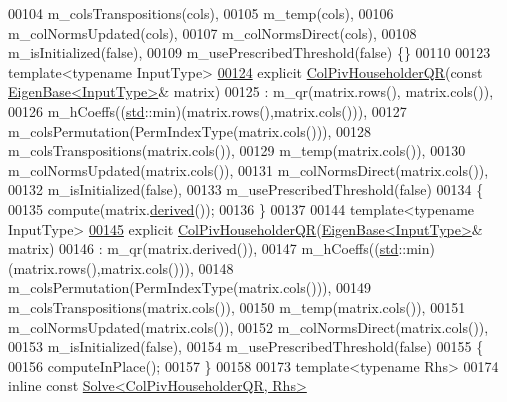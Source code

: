 \begin{DoxyCode}
00104         m\_colsTranspositions(cols),
00105         m\_temp(cols),
00106         m\_colNormsUpdated(cols),
00107         m\_colNormsDirect(cols),
00108         m\_isInitialized(false),
00109         m\_usePrescribedThreshold(false) \{\}
00110 
00123     \textcolor{keyword}{template}<\textcolor{keyword}{typename} InputType>
\hyperlink{group___q_r___module_a1aa6a5b95380df0ceb224cb833316d4f}{00124}     \textcolor{keyword}{explicit} \hyperlink{group___q_r___module_a1aa6a5b95380df0ceb224cb833316d4f}{ColPivHouseholderQR}(\textcolor{keyword}{const} \hyperlink{group___core___module_struct_eigen_1_1_eigen_base}{EigenBase<InputType>}& matrix)
00125       : m\_qr(matrix.rows(), matrix.cols()),
00126         m\_hCoeffs((\hyperlink{namespacestd}{std}::min)(matrix.rows(),matrix.cols())),
00127         m\_colsPermutation(PermIndexType(matrix.cols())),
00128         m\_colsTranspositions(matrix.cols()),
00129         m\_temp(matrix.cols()),
00130         m\_colNormsUpdated(matrix.cols()),
00131         m\_colNormsDirect(matrix.cols()),
00132         m\_isInitialized(false),
00133         m\_usePrescribedThreshold(false)
00134     \{
00135       compute(matrix.\hyperlink{group___core___module_a324b16961a11d2ecfd2d1b7dd7946545}{derived}());
00136     \}
00137 
00144     \textcolor{keyword}{template}<\textcolor{keyword}{typename} InputType>
\hyperlink{group___q_r___module_a65782010a93a4c9ef4a9191ac8fe30bc}{00145}     \textcolor{keyword}{explicit} \hyperlink{group___q_r___module_a65782010a93a4c9ef4a9191ac8fe30bc}{ColPivHouseholderQR}(\hyperlink{group___core___module_struct_eigen_1_1_eigen_base}{EigenBase<InputType>}& matrix)
00146       : m\_qr(matrix.derived()),
00147         m\_hCoeffs((\hyperlink{namespacestd}{std}::min)(matrix.rows(),matrix.cols())),
00148         m\_colsPermutation(PermIndexType(matrix.cols())),
00149         m\_colsTranspositions(matrix.cols()),
00150         m\_temp(matrix.cols()),
00151         m\_colNormsUpdated(matrix.cols()),
00152         m\_colNormsDirect(matrix.cols()),
00153         m\_isInitialized(false),
00154         m\_usePrescribedThreshold(false)
00155     \{
00156       computeInPlace();
00157     \}
00158 
00173     \textcolor{keyword}{template}<\textcolor{keyword}{typename} Rhs>
00174     \textcolor{keyword}{inline} \textcolor{keyword}{const} \hyperlink{group___core___module_class_eigen_1_1_solve}{Solve<ColPivHouseholderQR, Rhs>}

\end{DoxyCode}
